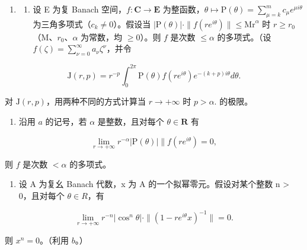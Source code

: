 \begin{enumerate}
\def\labelenumi{\arabic{enumi})}
\setcounter{enumi}{28}
\tightlist
\item
  \begin{enumerate}
  \def\labelenumii{\alph{enumii})}
  \tightlist
  \item
    设 E 为复 Banach 空间，\(f: \mathbf{C} \to \mathbf{E}\) 为整函数，\(\theta \mapsto \mathrm{P}(\theta) = \sum_{\mu=k}^{m} c_{\mu} e^{\mu i\theta}\) 为三角多项式（\(c_k \neq 0\)）。假设当 \(|\mathrm{P}(\theta)| \cdot \|f(re^{i\theta})\| \leqslant \mathrm{Mr}^{\alpha}\) 时 \(r \geqslant r_0\)（M、\(r_0\)、\(\alpha\) 为常数，均 \(\geqslant 0\)）。则 \(f\) 是次数 \(\leqslant \alpha\) 的多项式。（设 \(f(\zeta) = \sum_{\nu=0}^{\infty} a_{\nu} \zeta^{\nu}\)，并令
  \end{enumerate}
\end{enumerate}

\[
\mathrm{J} (r, p) = r ^ {- p} \int_ {0} ^ {2 \pi} \mathrm{P} (\theta) f (r e ^ {i \theta}) e ^ {- (k + p) i \theta} d \theta .
\]

对 \(\mathrm{J}(r,p)\)，用两种不同的方式计算当 \(r\to+\infty\) 时 \(p>\alpha.\) 的极限。

\begin{enumerate}
\def\labelenumi{\alph{enumi})}
\setcounter{enumi}{1}
\tightlist
\item
  沿用 \(a\) 的记号，若 \(\alpha\) 是整数，且对每个 \(\theta \in \mathbf{R}\) 有
\end{enumerate}

\[
\lim _ {r \to + \infty} r ^ {- \alpha} | \mathrm{P} (\theta) | \| f (r e ^ {i \theta}) = 0,
\]

则 \(f\) 是次数 \(< \alpha\) 的多项式。

\begin{enumerate}
\def\labelenumi{\alph{enumi})}
\setcounter{enumi}{2}
\tightlist
\item
  设 A 为复幺 Banach 代数，x 为 A 的一个拟幂零元。假设对某个整数 n \textgreater{} 0，且对每个 \(\theta \in R\)，有
\end{enumerate}

\[
\lim _ {r \to + \infty} r ^ {- n} | \cos^ {n} \theta | \cdot \| (1 - r e ^ {i \theta} x) ^ {- 1} \| = 0.
\]

则 \(x^n = 0\)。（利用 \(b\)。）

